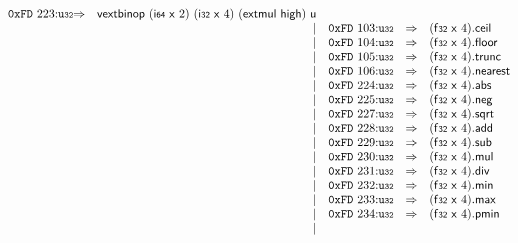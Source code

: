 $$\begin{array}{@{}l@{}rrlll@{}l@{}}
\mathtt{0xFD}~223{:}{\mathtt{u{\scriptstyle32}}} &\Rightarrow& \mathsf{vextbinop}~(\mathsf{i{\scriptstyle64}}~\mathsf{x}~2)~(\mathsf{i{\scriptstyle32}}~\mathsf{x}~4)~(\mathsf{extmul}~\mathsf{high})~\mathsf{u} \\ &&|&
\mathtt{0xFD}~103{:}{\mathtt{u{\scriptstyle32}}} &\Rightarrow& (\mathsf{f{\scriptstyle32}}~\mathsf{x}~4) . \mathsf{ceil} \\ &&|&
\mathtt{0xFD}~104{:}{\mathtt{u{\scriptstyle32}}} &\Rightarrow& (\mathsf{f{\scriptstyle32}}~\mathsf{x}~4) . \mathsf{floor} \\ &&|&
\mathtt{0xFD}~105{:}{\mathtt{u{\scriptstyle32}}} &\Rightarrow& (\mathsf{f{\scriptstyle32}}~\mathsf{x}~4) . \mathsf{trunc} \\ &&|&
\mathtt{0xFD}~106{:}{\mathtt{u{\scriptstyle32}}} &\Rightarrow& (\mathsf{f{\scriptstyle32}}~\mathsf{x}~4) . \mathsf{nearest} \\ &&|&
\mathtt{0xFD}~224{:}{\mathtt{u{\scriptstyle32}}} &\Rightarrow& (\mathsf{f{\scriptstyle32}}~\mathsf{x}~4) . \mathsf{abs} \\ &&|&
\mathtt{0xFD}~225{:}{\mathtt{u{\scriptstyle32}}} &\Rightarrow& (\mathsf{f{\scriptstyle32}}~\mathsf{x}~4) . \mathsf{neg} \\ &&|&
\mathtt{0xFD}~227{:}{\mathtt{u{\scriptstyle32}}} &\Rightarrow& (\mathsf{f{\scriptstyle32}}~\mathsf{x}~4) . \mathsf{sqrt} \\ &&|&
\mathtt{0xFD}~228{:}{\mathtt{u{\scriptstyle32}}} &\Rightarrow& (\mathsf{f{\scriptstyle32}}~\mathsf{x}~4) . \mathsf{add} \\ &&|&
\mathtt{0xFD}~229{:}{\mathtt{u{\scriptstyle32}}} &\Rightarrow& (\mathsf{f{\scriptstyle32}}~\mathsf{x}~4) . \mathsf{sub} \\ &&|&
\mathtt{0xFD}~230{:}{\mathtt{u{\scriptstyle32}}} &\Rightarrow& (\mathsf{f{\scriptstyle32}}~\mathsf{x}~4) . \mathsf{mul} \\ &&|&
\mathtt{0xFD}~231{:}{\mathtt{u{\scriptstyle32}}} &\Rightarrow& (\mathsf{f{\scriptstyle32}}~\mathsf{x}~4) . \mathsf{div} \\ &&|&
\mathtt{0xFD}~232{:}{\mathtt{u{\scriptstyle32}}} &\Rightarrow& (\mathsf{f{\scriptstyle32}}~\mathsf{x}~4) . \mathsf{min} \\ &&|&
\mathtt{0xFD}~233{:}{\mathtt{u{\scriptstyle32}}} &\Rightarrow& (\mathsf{f{\scriptstyle32}}~\mathsf{x}~4) . \mathsf{max} \\ &&|&
\mathtt{0xFD}~234{:}{\mathtt{u{\scriptstyle32}}} &\Rightarrow& (\mathsf{f{\scriptstyle32}}~\mathsf{x}~4) . \mathsf{pmin} \\ &&|&

\end{array}$$
